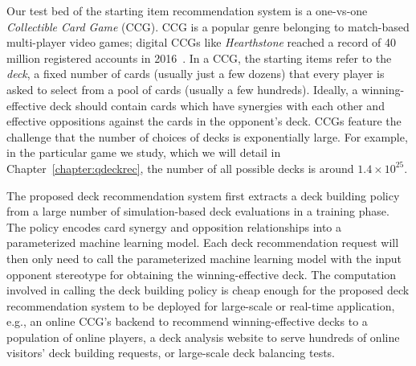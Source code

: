 Our test bed of the starting item recommendation system is a one-vs-one \textit{Collectible Card Game} (CCG). CCG is a popular genre belonging to match-based multi-player video games; digital CCGs like \textit{Hearthstone} reached a record of 40 million registered accounts in 2016~\cite{hearthstonepopular}. In a CCG, the starting items refer to the \textit{deck}, a fixed number of cards (usually just a few dozens) that every player is asked to select from a pool of cards (usually a few hundreds). Ideally, a winning-effective deck should contain cards which have synergies with each other and effective oppositions against the cards in the opponent's deck. CCGs feature the challenge that the number of choices of decks is exponentially large. For example, in the particular game we study, which we will detail in Chapter~\ref{chapter:qdeckrec}, the number of all possible decks is around $1.4 \times 10^{25}$. 

The proposed deck recommendation system first extracts a deck building policy from a large number of simulation-based deck evaluations in a training phase. The policy encodes card synergy and opposition relationships into a parameterized machine learning model. Each deck recommendation request will then only need to call the parameterized machine learning model with the input opponent stereotype for obtaining the winning-effective deck. The computation involved in calling the deck building policy is cheap enough for the proposed deck recommendation system to be deployed for large-scale or real-time application, e.g., an online CCG's backend to recommend winning-effective decks to a population of online players, a deck analysis website to serve hundreds of online visitors' deck building requests, or large-scale deck balancing tests. 


